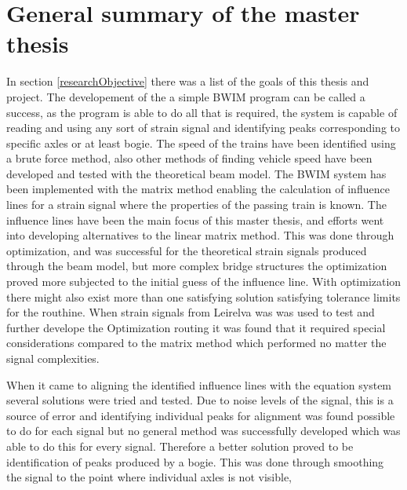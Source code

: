 \section{General summary of the master thesis}
In section \ref{researchObjective} there was a list of the goals of this thesis and project. The developement of the a simple BWIM program can be called a success, as the program is able to do all that is required, the system is capable of reading and using any sort of strain signal and identifying peaks corresponding to specific axles or at least bogie. The speed of the trains have been identified using a brute force method, also other methods of finding vehicle speed have been developed and tested with the theoretical beam model. The BWIM system has been implemented with the matrix method enabling the calculation of influence lines for a strain signal where the properties of the passing train is known. The influence lines have been the main focus of this master thesis, and efforts went into developing alternatives to the linear matrix method. This was done through optimization, and was successful for the theoretical strain signals produced through the beam model, but more complex bridge structures the optimization proved more subjected to the initial guess of the influence line. With optimization there might also exist more than one satisfying solution satisfying tolerance limits for the routhine. When strain signals from Leirelva was was used to test and further develope the Optimization routing it was found that it required special considerations compared to the matrix method which performed no matter the signal complexities.

When it came to aligning the identified influence lines with the equation system several solutions were tried and tested. Due to noise levels of the signal, this is a source of error and identifying individual peaks for alignment was found possible to do for each signal but no general method was successfully developed which was able to do this for every signal. Therefore a better solution proved to be identification of peaks produced by a bogie. This was done through smoothing the signal to the point where individual axles is not visible,



